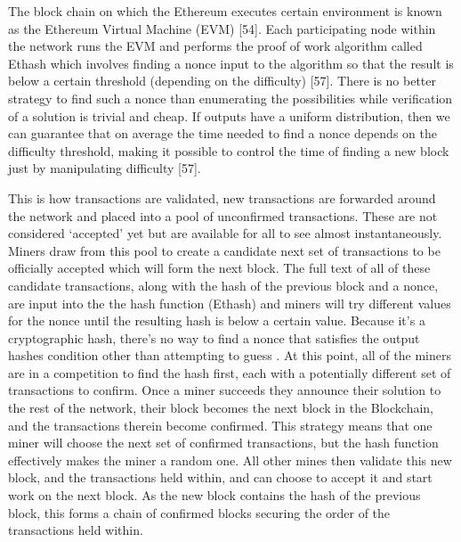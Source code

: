 \documentclass{article}
\begin{document}
The block chain on which the Ethereum executes certain environment is known as the Ethereum Virtual Machine (EVM) {\Large [54]}. Each participating node within the network runs the EVM and performs the proof of work algorithm called Ethash which involves finding a nonce input to the algorithm so that the result is below a certain threshold (depending on the difficulty) {\Large [57]}. There is no better strategy to find such a nonce than enumerating the possibilities while verification of a solution is trivial and cheap. If outputs have a uniform distribution, then we can guarantee that on average the time needed to find a nonce depends on the difficulty threshold, making it possible to control the time of finding a new block just by manipulating difficulty {\Large [57]}.

This is how transactions are validated, new transactions are forwarded around the network and placed into a pool of unconfirmed transactions. These are not considered `accepted' yet but are available for all to see almost instantaneously. Miners draw from this pool to create a candidate next set of transactions to be officially accepted which will form the next block. The full text of all of these candidate transactions, along with the hash of the previous block and a nonce, are input into the the hash function (Ethash) and miners will try different values for the nonce until the resulting hash is below a certain value. Because it's a cryptographic hash, there's no way to find a nonce that satisfies the output hashes condition other than attempting to guess \citep{20_developer_guide_bitcoin_2016}. At this point, all of the miners are in a competition to find the hash first, each with a potentially different set of transactions to confirm. Once a miner succeeds they announce their solution to the rest of the network, their block becomes the next block in the Blockchain, and the transactions therein become confirmed. This strategy means that one miner will choose the next set of confirmed transactions, but the hash function effectively makes the miner a random one. All other mines then validate this new block, and the transactions held within, and can choose to accept it and start work on the next block. As the new block contains the hash of the previous block, this forms a chain of confirmed blocks securing the order of the transactions held within.
\end{document}
